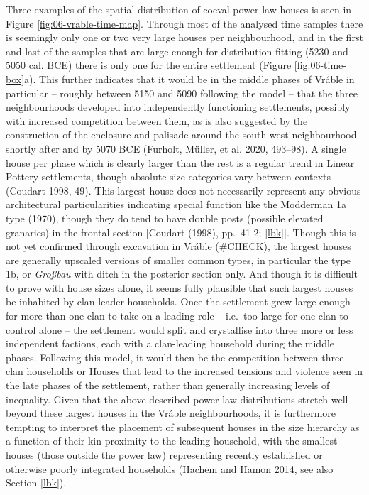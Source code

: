 \documentclass[
  12pt,
  a4paper, twoside]{book}
\begin{document}
Three examples of the spatial distribution of coeval power-law houses is seen in Figure \ref{fig:06-vrable-time-map}. Through most of the analysed time samples there is seemingly only one or two very large houses per neighbourhood, and in the first and last of the samples that are large enough for distribution fitting (5230 and 5050 cal. BCE) there is only one for the entire settlement (Figure \ref{fig:06-time-box}a). This further indicates that it would be in the middle phases of Vráble in particular -- roughly between 5150 and 5090 following the model -- that the three neighbourhoods developed into independently functioning settlements, possibly with increased competition between them, as is also suggested by the construction of the enclosure and palisade around the south-west neighbourhood shortly after and by 5070 BCE (Furholt, Müller, et al. 2020, 493--98). A single house per phase which is clearly larger than the rest is a regular trend in Linear Pottery settlements, though absolute size categories vary between contexts (Coudart 1998, 49). This largest house does not necessarily represent any obvious architectural particularities indicating special function like the Modderman 1a type (1970), though they do tend to have double posts (possible elevated granaries) in the frontal section {[}Coudart (1998), pp.~41-2; \ref{lbk}{]}. Though this is not yet confirmed through excavation in Vráble (\#CHECK), the largest houses are generally upscaled versions of smaller common types, in particular the type 1b, or \emph{Großbau} with ditch in the posterior section only. And though it is difficult to prove with house sizes alone, it seems fully plausible that such largest houses be inhabited by clan leader households. Once the settlement grew large enough for more than one clan to take on a leading role -- i.e.~too large for one clan to control alone -- the settlement would split and crystallise into three more or less independent factions, each with a clan-leading household during the middle phases. Following this model, it would then be the competition between three clan households or Houses that lead to the increased tensions and violence seen in the late phases of the settlement, rather than generally increasing levels of inequality. Given that the above described power-law distributions stretch well beyond these largest houses in the Vráble neighbourhoods, it is furthermore tempting to interpret the placement of subsequent houses in the size hierarchy as a function of their kin proximity to the leading household, with the smallest houses (those outside the power law) representing recently established or otherwise poorly integrated households (Hachem and Hamon 2014, see also Section \ref{lbk}).
\end{document}
